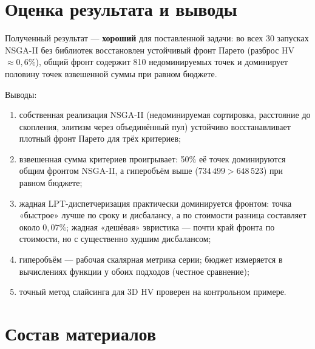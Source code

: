 \documentclass[12pt,a4paper]{article}
\begin{document}
\section{Оценка результата и выводы}

Полученный результат --- \textbf{хороший} для поставленной задачи: во
всех 30 запусках NSGA-II без библиотек восстановлен устойчивый фронт
Парето (разброс HV $\approx 0{,}6\%$), общий фронт содержит 810
недоминируемых точек и доминирует половину точек взвешенной суммы при
равном бюджете.

Выводы:
\begin{enumerate}
\item собственная реализация NSGA-II (недоминируемая сортировка,
  расстояние до скопления, элитизм через объединённый пул) устойчиво
  восстанавливает плотный фронт Парето для трёх критериев;
\item взвешенная сумма критериев проигрывает: 50\% её точек
  доминируются общим фронтом NSGA-II, а гиперобъём выше
  ($734\,499 > 648\,523$) при равном бюджете;
\item жадная LPT-диспетчеризация практически доминируется фронтом:
  точка «быстрое» лучше по сроку и дисбалансу, а по стоимости разница
  составляет около $0{,}07\%$; жадная «дешёвая» эвристика --- почти
  край фронта по стоимости, но с существенно худшим дисбалансом;
\item гиперобъём --- рабочая скалярная метрика серии; бюджет измеряется
  в вычислениях функции у обоих подходов (честное сравнение);
\item точный метод слайсинга для 3D HV проверен на контрольном примере.
\end{enumerate}

\section*{Состав материалов}
\end{document}
